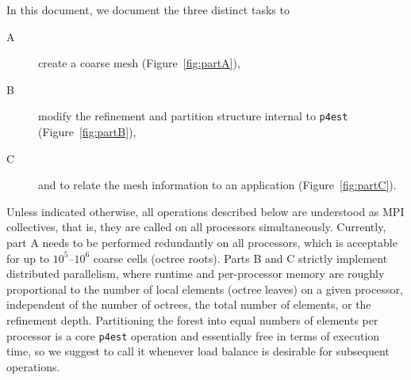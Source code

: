 \documentclass[letterpaper,11pt]{article}
\newcommand{\pforest}{\texttt{p4est}\xspace}
\newcommand{\figref}[1]{Figure~\ref{fig:#1}}
\begin{document}
In this document, we document the three distinct tasks to
\begin{description}
\item[A] create a coarse mesh (\figref{partA}),
\item[B] modify the refinement and partition structure internal to \pforest
  (\figref{partB}),
\item[C] and to relate the mesh information to an application (\figref{partC}).
\end{description}
Unless indicated otherwise, all operations described below are understood as
MPI collectives, that is, they are called on all processors simultaneously.
Currently, part A needs to be performed redundantly on all processors, which is
acceptable for up to $10^5$--$10^6$ coarse cells (octree roots).  Parts B and C
strictly implement distributed parallelism, where runtime and per-processor
memory are roughly proportional to the number of local elements (octree leaves)
on a given processor, independent of the number of octrees, the total number of
elements, or the refinement depth.  Partitioning the forest into equal numbers
of elements per processor is a core \pforest operation and essentially free in
terms of execution time, so we suggest to call it whenever load balance is
desirable for subsequent operations.
\end{document}

